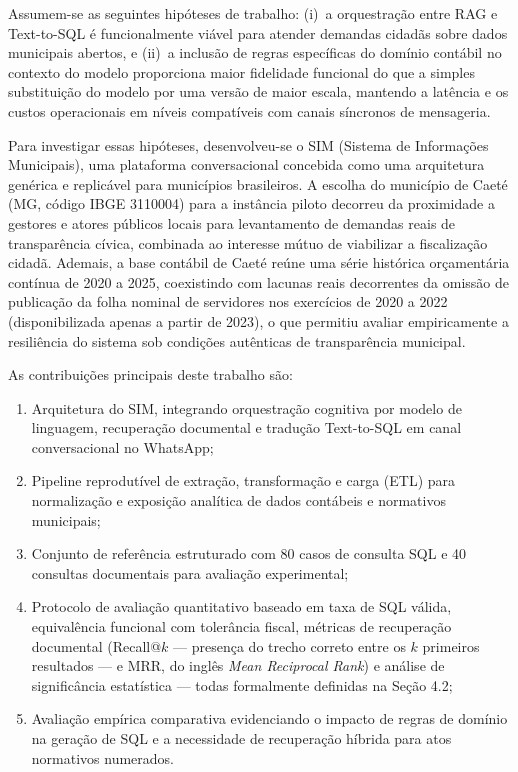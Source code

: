 \documentclass[12pt]{article}
\begin{document}
Assumem-se as seguintes hipóteses de trabalho: (i)~a orquestração entre RAG e Text-to-SQL é funcionalmente viável para atender demandas cidadãs sobre dados municipais abertos, e (ii)~a inclusão de regras específicas do domínio contábil no contexto do modelo proporciona maior fidelidade funcional do que a simples substituição do modelo por uma versão de maior escala, mantendo a latência e os custos operacionais em níveis compatíveis com canais síncronos de mensageria.

Para investigar essas hipóteses, desenvolveu-se o SIM (Sistema de Informações Municipais), uma plataforma conversacional concebida como uma arquitetura genérica e replicável para municípios brasileiros. A escolha do município de Caeté (MG, código IBGE 3110004) para a instância piloto decorreu da proximidade a gestores e atores públicos locais para levantamento de demandas reais de transparência cívica, combinada ao interesse mútuo de viabilizar a fiscalização cidadã. Ademais, a base contábil de Caeté reúne uma série histórica orçamentária contínua de 2020 a 2025, coexistindo com lacunas reais decorrentes da omissão de publicação da folha nominal de servidores nos exercícios de 2020 a 2022 (disponibilizada apenas a partir de 2023), o que permitiu avaliar empiricamente a resiliência do sistema sob condições autênticas de transparência municipal.

As contribuições principais deste trabalho são:
\begin{enumerate}
    \item Arquitetura do SIM, integrando orquestração cognitiva por modelo de linguagem, recuperação documental e tradução Text-to-SQL em canal conversacional no WhatsApp;
    \item Pipeline reprodutível de extração, transformação e carga (ETL) para normalização e exposição analítica de dados contábeis e normativos municipais;
    \item Conjunto de referência estruturado com 80 casos de consulta SQL e 40 consultas documentais para avaliação experimental;
    \item Protocolo de avaliação quantitativo baseado em taxa de SQL válida, equivalência funcional com tolerância fiscal, métricas de recuperação documental (Recall@$k$ --- presença do trecho correto entre os $k$ primeiros resultados --- e MRR, do inglês \textit{Mean Reciprocal Rank}) e análise de significância estatística --- todas formalmente definidas na Seção 4.2;
    \item Avaliação empírica comparativa evidenciando o impacto de regras de domínio na geração de SQL e a necessidade de recuperação híbrida para atos normativos numerados.
\end{enumerate}
\end{document}
